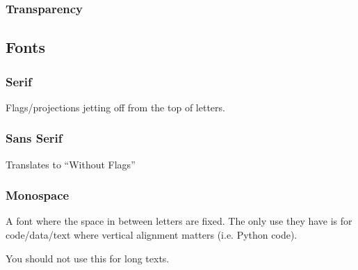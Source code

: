 \subsubsection{Transparency}

\subsection{ Fonts}
\subsubsection{Serif}
Flags/projections jetting off from the top of letters.

\subsubsection{Sans Serif}
Translates to ``Without Flags''

\subsubsection{Monospace}
A font where the space in between letters are fixed. The only use they have is for code/data/text where vertical alignment matters (i.e. Python code). 
\begin{important}
    You should not use this for long texts.
\end{important}